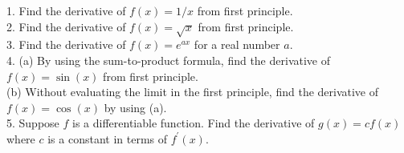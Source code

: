 1. Find the derivative of $f(x)=1/x$ from first principle.\\
2. Find the derivative of $f(x)=\sqrt x$ from first principle.\\
3. Find the derivative of $f(x)=e^{ax}$ for a real number $a$.\\
4. (a) By using the sum-to-product formula, find the derivative of $f(x)=\sin(x)$ from first principle.\\
(b) Without evaluating the limit in the first principle, find the derivative of $f(x)=\cos(x)$ by using (a).\\
5. Suppose $f$ is a differentiable function. Find the derivative of $g(x)=cf(x)$ where $c$ is a constant in terms of $f^\prime(x)$.